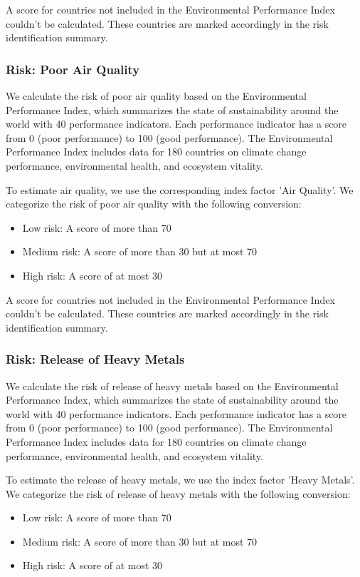 \documentclass{article}
\begin{document}
A score for countries not included in the Environmental Performance Index couldn't be calculated. These countries are marked accordingly in the risk identification summary.

\subsubsection*{Risk: Poor Air Quality}

We calculate the risk of poor air quality based on the Environmental Performance Index, which summarizes the state of sustainability around the world with
40 performance indicators. Each performance indicator has a score from 0 (poor performance) to 100 (good performance). The Environmental Performance Index includes data
for 180 countries on climate change performance, environmental health, and ecosystem vitality.

To estimate air quality, we use the corresponding index factor 'Air Quality'. We categorize the risk of poor air quality with the following conversion:
\begin{itemize}
    \item Low risk: A score of more than 70
    \item Medium risk: A score of more than 30 but at most 70
    \item High risk: A score of at most 30
\end{itemize}

A score for countries not included in the Environmental Performance Index couldn't be calculated. These countries are marked accordingly in the risk identification summary.

\subsubsection*{Risk: Release of Heavy Metals}

We calculate the risk of release of heavy metals based on the Environmental Performance Index, which summarizes the state of sustainability around the world with
40 performance indicators. Each performance indicator has a score from 0 (poor performance) to 100 (good performance). The Environmental Performance Index includes data
for 180 countries on climate change performance, environmental health, and ecosystem vitality.

To estimate the release of heavy metals, we use the index factor 'Heavy Metals'. We categorize the risk of release of heavy metals with the following conversion:
\begin{itemize}
    \item Low risk: A score of more than 70
    \item Medium risk: A score of more than 30 but at most 70
    \item High risk: A score of at most 30
\end{itemize}
\end{document}
